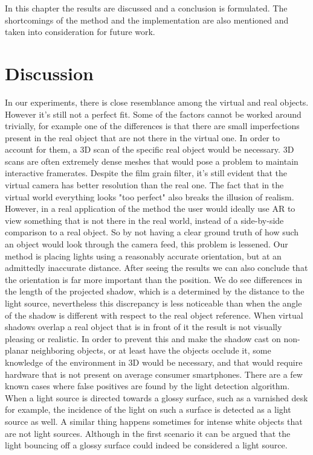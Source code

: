 In this chapter the results are discussed and a conclusion is formulated. The shortcomings of the method and the implementation are also mentioned and taken into consideration for future work.

\section{Discussion}
In our experiments, there is close resemblance among the virtual and real objects. However it's still not a perfect fit. Some of the factors cannot be worked around trivially, for example one of the differences is that there are small imperfections present in the real object that are not there in the virtual one. In order to account for them, a 3D scan of the specific real object would be necessary. 3D scans are often extremely dense meshes that would pose a problem to maintain interactive framerates.\newline
Despite the film grain filter, it's still evident that the virtual camera has better resolution than the real one. The fact that in the virtual world everything looks "too perfect" also breaks the illusion of realism. However, in a real application of the method the user would ideally use AR to view something that is not there in the real world, instead of a side-by-side comparison to a real object. So by not having a clear ground truth of how such an object would look through the camera feed, this problem is lessened.\newline
Our method is placing lights using a reasonably accurate orientation, but at an admittedly inaccurate distance. After seeing the results we can also conclude that the orientation is far more important than the position. We do see differences in the length of the projected shadow, which is a determined by the distance to the light source, nevertheless this discrepancy is less noticeable than when the angle of the shadow is different with respect to the real object reference.\newline
When virtual shadows overlap a real object that is in front of it the result is not visually pleasing or realistic. In order to prevent this and make the shadow cast on non-planar neighboring objects, or at least have the objects occlude it, some knowledge of the environment in 3D would be necessary, and that would require hardware that is not present on average consumer smartphones.\newline
There are a few known cases where false positives are found by the light detection algorithm. When a light source is directed towards a glossy surface, such as a varnished desk for example, the incidence of the light on such a surface is detected as a light source as well. A similar thing happens sometimes for intense white objects that are not light sources. Although in the first scenario it can be argued that the light bouncing off a glossy surface could indeed be considered a light source. \newline

